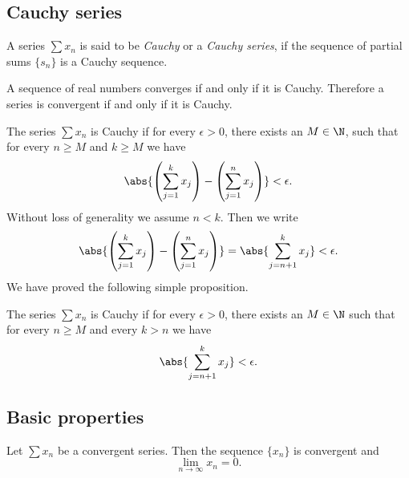 \documentclass[12pt]{book}
\begin{document}
\subsection*{Cauchy series}

\begin{defn}
A series $\sum x_n$ is said to be \emph{Cauchy} or a
\emph{Cauchy series},
if the sequence of partial sums $\{ s_n \}$ is a Cauchy sequence.
\end{defn}

A sequence of real numbers converges if and only if it is
Cauchy.
Therefore a series is convergent if and only if it is Cauchy.

The series $\sum x_n$ is Cauchy if for every $\epsilon > 0$,
there exists an $M \in \N$, such that for every $n \geq M$
and $k \geq M$ we have
\begin{equation*}
\abs{ \left( \sum_{j=1}^k x_j \right) - \left( \sum_{j=1}^n x_j \right) }
< \epsilon .
\end{equation*}
Without loss of generality we assume $n < k$.
Then we write
\begin{equation*}
\abs{ \left( \sum_{j=1}^k x_j \right) - \left( \sum_{j=1}^n x_j \right) }
=
\abs{ \sum_{j={n+1}}^k x_j }
< \epsilon .
\end{equation*}
We have proved the following simple proposition.

\begin{prop} \label{prop:cachyser}
The series $\sum x_n$ is Cauchy if for every $\epsilon > 0$, 
there exists an $M \in \N$ such that for every $n \geq M$
and every $k > n$ we have
\begin{equation*}
\abs{ \sum_{j={n+1}}^k x_j }
< \epsilon .
\end{equation*}
\end{prop}

\subsection*{Basic properties}


\begin{prop}
Let $\sum x_n$ be a convergent series.
Then
the sequence $\{ x_n \}$ is convergent and
\begin{equation*}
\lim_{n\to\infty} x_n = 0.
\end{equation*}
\end{prop}
\end{document}
